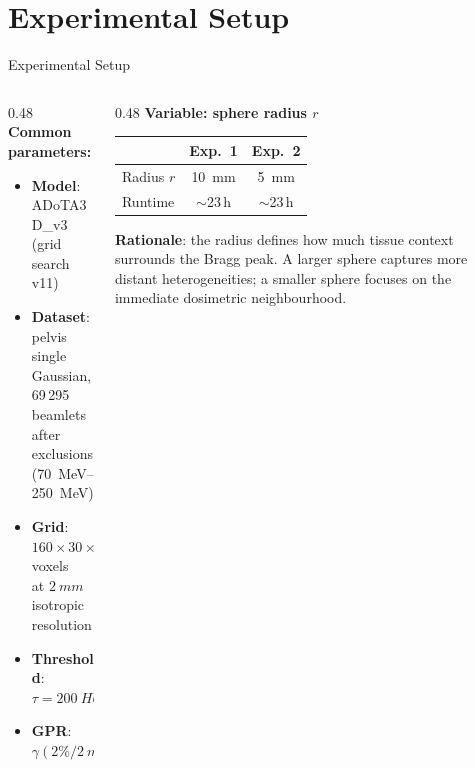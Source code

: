 \documentclass[aspectratio=169, 10pt]{beamer}
\begin{document}
\section{Experimental Setup}

\begin{frame}{Experimental Setup}
  \begin{columns}[T]
    \begin{column}{0.48\textwidth}
      \textbf{Common parameters:}
      \begin{itemize}
        \item \textbf{Model}: ADoTA3D\_v3 (grid search v11)
        \item \textbf{Dataset}: pelvis single Gaussian,\\
              69\,295 beamlets after exclusions\\
              (\SI{70}{MeV}--\SI{250}{MeV})
        \item \textbf{Grid}: $160 \times 30 \times 30$ voxels\\
              at $\SI{2}{mm}$ isotropic resolution
        \item \textbf{Threshold}: $\tau = \SI{200}{HU}$
        \item \textbf{GPR}: $\gamma(2\%/\SI{2}{mm})$
      \end{itemize}
    \end{column}

    \begin{column}{0.48\textwidth}
      \textbf{Variable: sphere radius $r$}
      \vspace{4pt}
      \begin{table}[h]
        \centering
        \small
        \begin{tabular}{lcc}
          \toprule
          & \textbf{Exp.~1} & \textbf{Exp.~2} \\
          \midrule
          Radius $r$    & \SI{10}{mm} & \SI{5}{mm}  \\
          Runtime       & $\sim$23\,h & $\sim$23\,h \\
          \bottomrule
        \end{tabular}
      \end{table}

      \vspace{8pt}
      {\small \textbf{Rationale}: the radius defines how much tissue
       context surrounds the Bragg peak.  A larger sphere captures
       more distant heterogeneities; a smaller sphere focuses on the
       immediate dosimetric neighbourhood.}
    \end{column}
  \end{columns}
\end{frame}
\end{document}
